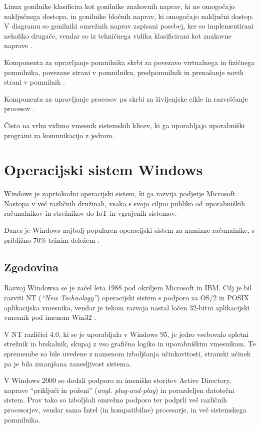 \documentclass[a4paper,12pt,openright]{book}
\begin{document}
Linux gonilnike klasificira kot gonilnike znakovnih naprav, ki ne omogočajo naključnega dostopa, in gonilnike bločnih naprav, ki omogočajo naključni dostop.
V diagramu so gonilniki omrežnih naprav zapisani posebej, ker so implementirani nekoliko drugače, vendar so iz tehničnega vidika klasificirani kot znakovne naprave \cite{Tanenbaum_Bos_2023}.

Komponenta za upravljanje pomnilnika skrbi za povezavo virtualnega in fizičnega pomnilnika, povezane strani v pomnilniku, predpomnilnik in prenašanje novih strani v pomnilnik \cite{Tanenbaum_Bos_2023}.

Komponenta za upravljanje procesov pa skrbi za življenjske cikle in razvrščanje procesov \cite{Tanenbaum_Bos_2023}.

Čisto na vrhu vidimo vmesnik sistemskih klicev, ki ga uporabljajo uporabniški programi za komunikacijo z jedrom.

\section{Operacijski sistem Windows}

Windows je zaprtokodni operacijski sistem, ki ga razvija podjetje Microsoft.
Nastopa v več različnih družinah, vsaka s svojo ciljno publiko od uporabniških računalnikov in strežnikov do IoT in vgrajenih sistemov.

Danes je Windows najbolj popularen operacijski sistem za namizne raču\-nalnike, s približno 70\% tržnim deležem \cite{Statcounter_OS_2024}.

\subsection{Zgodovina}

Razvoj Windowsa se je začel leta 1988 pod okriljem Microsoft in IBM.
Cilj je bil razviti NT (\textit{``New Technology''}) operacijski sistem s podporo za OS/2 in POSIX aplikacijska vmesnika, vendar je tekom razvoja nastal ločen 32-bitni aplikacijski vmesnik pod imenom Win32 \cite{Silberschatz_Galvin_Gagne_2018}.

V NT različici 4.0, ki se je uporabljala v Windows 95, je jedro vsebovalo spletni strežnik in brskalnik, skupaj z vso grafično logiko in uporabniškim vmesnikom.
Te spremembe so bile uvedene z namenom izboljšanja učinkovitosti, stranski učinek pa je bila zmanjšana zanesljivost sistema.

V Windows 2000 so dodali podporo za imeniško storitev Active Directory, naprave ``priključi in poženi'' (\textit{angl. plug-and-play}) in porazdeljen datotečni sistem.
Prav tako so izboljšali omrežno podporo ter podprli več različnih procesorjev, vendar samo Intel (in kompatibilne) procesorje, in več sistemskega pomnilnika.
\end{document}
